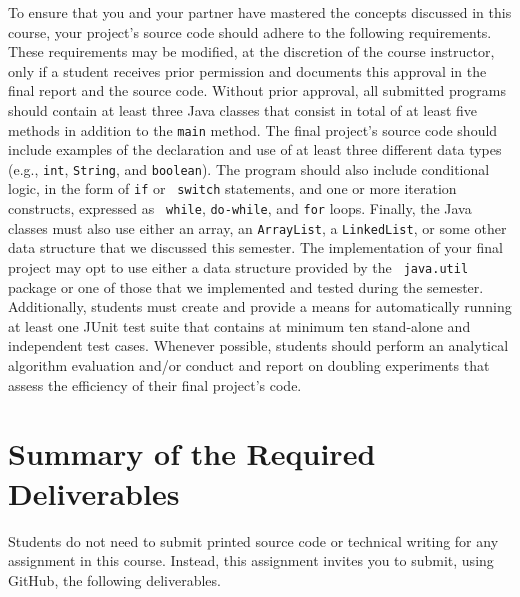 \documentclass[11pt]{article}
\begin{document}
To ensure that you and your partner have mastered the concepts discussed in this
course, your project's source code should adhere to the following requirements.
These requirements may be modified, at the discretion of the course instructor,
only if a student receives prior permission and documents this approval in the
final report and the source code. Without prior approval, all submitted programs
should contain at least three Java classes that consist in total of at least
five methods in addition to the {\tt main} method. The final project's source
code should include examples of the declaration and use of at least three
different data types (e.g., {\tt int}, {\tt String}, and {\tt boolean}). The
program should also include conditional logic, in the form of {\tt if} or {\tt
switch} statements, and one or more iteration constructs, expressed as {\tt
while}, {\tt do-while}, and {\tt for} loops. Finally, the Java classes must
also use either an array, an {\tt ArrayList}, a {\tt LinkedList}, or some
other data structure that we discussed this semester. The implementation of
your final project may opt to use either a data structure provided by the {\tt
java.util} package or one of those that we implemented and tested during the
semester. Additionally, students must create and provide a means for
automatically running at least one JUnit test suite that contains at minimum
ten stand-alone and independent test cases. Whenever possible, students should
perform an analytical algorithm evaluation and/or conduct and report on
doubling experiments that assess the efficiency of their final project's code.

\section*{Summary of the Required Deliverables}

\noindent Students do not need to submit printed source code or technical
writing for any assignment in this course. Instead, this assignment invites you
to submit, using GitHub, the following deliverables.
\end{document}
